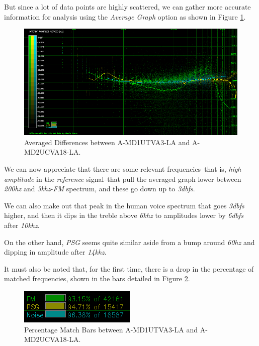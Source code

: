 \documentclass[10pt,a4paper]{report}
\newcommand{\hz}[1]{\textit{#1\acrshort{hz}}}
\newcommand{\khz}[1]{\textit{#1\acrshort{khz}}}
\newcommand{\db}[1]{\textit{#1\acrshort{dbfs}}}
\begin{document}
But since a lot of data points are highly scattered, we can gather more accurate information for analysis using the \textit{Average Graph} option as shown in Figure \ref{fig:A-MD1UTVA3-LA_vs_A-MD2UCVA18-LA_AVG}.

\begin{figure}[H]
	\centering
	\includegraphics[width=1.0\linewidth]{images/results/5-2-A-MD1UTVA3-LA_vs_A-MD2UCVA18-LA.png}
	\caption[A-MD1UTVA3-LA vs A-MD2UCVA18-LA Averaged]{Averaged Differences between A-MD1UTVA3-LA and A-MD2UCVA18-LA.}
	\label{fig:A-MD1UTVA3-LA_vs_A-MD2UCVA18-LA_AVG}
\end{figure}

We can now appreciate that there are some relevant frequencies--that is, \textit{high amplitude} in the \textit{reference} signal--that pull the averaged graph lower between \hz{200} and \khz{3}-\textit{FM} spectrum, and these go down up to \db{3}.

We can also make out that peak in the human voice spectrum that goes \db{3} higher, and then it dips in the treble above \khz{6} to amplitudes lower by \db{6} after \khz{10}.

On the other hand, \textit{PSG} seems quite similar aside from a bump around \hz{60} and dipping in amplitude after \khz{14}.

It must also be noted that, for the first time, there is a drop in the percentage of matched frequencies, shown in the bars detailed in Figure \ref{fig:A-MD1UTVA3-LA_vs_A-MD2UCVA18-LA_BARS}.

\begin{figure}[H]
	\centering
	\includegraphics[width=0.4\linewidth]{images/results/5-3-A-MD1UTVA3-LA_vs_A-MD2UCVA18-LA_bars.png}
	\caption[A-MD1UTVA3-LA vs A-MD2UCVA18-LA Bars]{Percentage Match Bars between A-MD1UTVA3-LA and A-MD2UCVA18-LA.}
	\label{fig:A-MD1UTVA3-LA_vs_A-MD2UCVA18-LA_BARS}
\end{figure}
\end{document}
